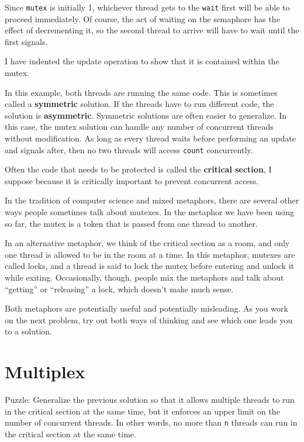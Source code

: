 \documentclass{book}
\begin{document}
Since {\tt mutex} is initially 1, whichever thread gets to
the {\tt wait} first will be able to proceed immediately.
Of course, the act of waiting on the semaphore has the effect
of decrementing it, so the second thread to
arrive will have to wait until the first signals.

I have indented the update operation to show that it is contained
within the mutex.

In this example, both threads are running the same code.  This is
sometimes called a {\bf symmetric} solution.  If the threads have to
run different code, the solution is {\bf asymmetric}.  Symmetric
solutions are often easier to generalize.  In this case, the mutex
solution can handle any number of concurrent threads without
modification.  As long as every thread waits before 
performing an update and signals after, then no two threads
will access {\tt count} concurrently.

Often the code that needs to be protected is called the
{\bf critical section}, I suppose because it is critically
important to prevent concurrent access.

In the tradition of computer science and mixed metaphors, there
are several other ways people sometimes talk about mutexes.  In
the metaphor we have been using so far, the mutex is a token
that is passed from one thread to another.

In an alternative
metaphor, we think of the critical section as a room, and
only one thread is allowed to be in the room at a time.
In this metaphor, mutexes are called locks, and a thread
is said to lock the mutex before entering and unlock it while
exiting.  Occasionally, though, people mix the metaphors and
talk about ``getting'' or ``releasing'' a lock, which doesn't
make much sense.

Both metaphors are potentially useful and potentially misleading.
As you work on the next problem, try out both ways of thinking
and see which one leads you to a solution.


\section{Multiplex}

Puzzle: Generalize the previous solution so that it allows multiple
threads to run in the critical section at the same time, but it
enforces an upper limit on the number of concurrent threads.  In other
words, no more than {\tt n} threads can run in the critical section at
the same time.
\end{document}
